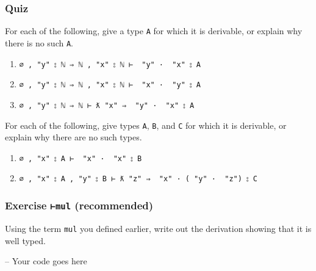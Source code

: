 \hypertarget{quiz-3}{%
\subsubsection{Quiz}\label{quiz-3}}

For each of the following, give a type \texttt{A} for which it is
derivable, or explain why there is no such \texttt{A}.

\begin{enumerate}
\def\labelenumi{\arabic{enumi}.}
\tightlist
\item
  \texttt{∅\ ,\ "y"\ ⦂\ \textasciigrave{}ℕ\ ⇒\ \textasciigrave{}ℕ\ ,\ "x"\ ⦂\ \textasciigrave{}ℕ\ ⊢\ \textasciigrave{}\ "y"\ ·\ \textasciigrave{}\ "x"\ ⦂\ A}
\item
  \texttt{∅\ ,\ "y"\ ⦂\ \textasciigrave{}ℕ\ ⇒\ \textasciigrave{}ℕ\ ,\ "x"\ ⦂\ \textasciigrave{}ℕ\ ⊢\ \textasciigrave{}\ "x"\ ·\ \textasciigrave{}\ "y"\ ⦂\ A}
\item
  \texttt{∅\ ,\ "y"\ ⦂\ \textasciigrave{}ℕ\ ⇒\ \textasciigrave{}ℕ\ ⊢\ ƛ\ "x"\ ⇒\ \textasciigrave{}\ "y"\ ·\ \textasciigrave{}\ "x"\ ⦂\ A}
\end{enumerate}

For each of the following, give types \texttt{A}, \texttt{B}, and
\texttt{C} for which it is derivable, or explain why there are no such
types.

\begin{enumerate}
\def\labelenumi{\arabic{enumi}.}
\tightlist
\item
  \texttt{∅\ ,\ "x"\ ⦂\ A\ ⊢\ \textasciigrave{}\ "x"\ ·\ \textasciigrave{}\ "x"\ ⦂\ B}
\item
  \texttt{∅\ ,\ "x"\ ⦂\ A\ ,\ "y"\ ⦂\ B\ ⊢\ ƛ\ "z"\ ⇒\ \textasciigrave{}\ "x"\ ·\ (\textasciigrave{}\ "y"\ ·\ \textasciigrave{}\ "z")\ ⦂\ C}
\end{enumerate}

\hypertarget{exercise-mul-recommended-1}{%
\subsubsection{\texorpdfstring{Exercise \texttt{⊢mul}
(recommended)}{Exercise ⊢mul (recommended)}}\label{exercise-mul-recommended-1}}

Using the term \texttt{mul} you defined earlier, write out the
derivation showing that it is well typed.

\begin{fence}
\begin{code}
-- Your code goes here
\end{code}
\end{fence}

